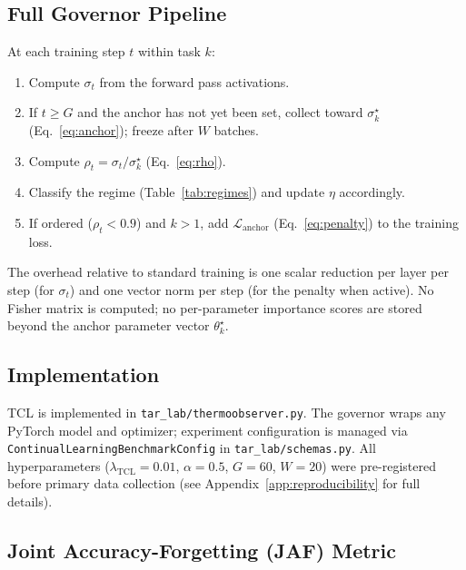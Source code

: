 \documentclass[10pt,a4paper]{article}
\begin{document}
\subsection{Full Governor Pipeline}

At each training step $t$ within task $k$:
\begin{enumerate}
    \item Compute $\sigma_t$ from the forward pass activations.
    \item If $t \geq G$ and the anchor has not yet been set, collect toward $\sigma^\star_k$
          (Eq.~\ref{eq:anchor}); freeze after $W$ batches.
    \item Compute $\rho_t = \sigma_t / \sigma^\star_k$ (Eq.~\ref{eq:rho}).
    \item Classify the regime (Table~\ref{tab:regimes}) and update $\eta$ accordingly.
    \item If ordered ($\rho_t < 0.9$) and $k > 1$, add $\mathcal{L}_{\text{anchor}}$
          (Eq.~\ref{eq:penalty}) to the training loss.
\end{enumerate}
The overhead relative to standard training is one scalar reduction per layer per step
(for $\sigma_t$) and one vector norm per step (for the penalty when active).
No Fisher matrix is computed; no per-parameter importance scores are stored beyond
the anchor parameter vector $\theta^\star_k$.

\subsection{Implementation}

TCL is implemented in \texttt{tar\_lab/thermoobserver.py}.
The governor wraps any PyTorch model and optimizer; experiment configuration is
managed via \texttt{ContinualLearningBenchmarkConfig} in \texttt{tar\_lab/schemas.py}.
All hyperparameters ($\lambda_{\text{TCL}} = 0.01$, $\alpha = 0.5$, $G = 60$,
$W = 20$) were pre-registered before primary data collection
(see Appendix~\ref{app:reproducibility} for full details).

\subsection{Joint Accuracy-Forgetting (JAF) Metric}
\label{sec:jaf-metric}
\end{document}
